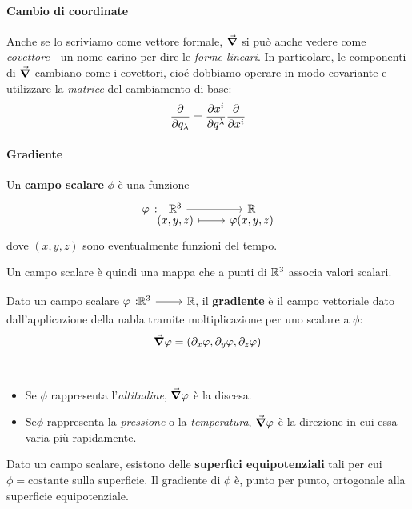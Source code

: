 \paragraph{Cambio di coordinate} %
Anche se lo scriviamo come vettore formale, $\grad$ si può anche vedere come \textit{covettore} - un nome carino per dire le \textit{forme lineari}. In particolare, le componenti di $\grad$ cambiano come i covettori, cioé dobbiamo operare in modo covariante e utilizzare la \textit{matrice} del cambiamento di base:
\begin{equation}
	\pdv{q_\lambda}=\pdv{x^i}{q^\lambda}\pdv{x^i}
\end{equation}
\paragraph{Gradiente}
\begin{define}
	Un \textbf{campo scalare} $\phi$ è una funzione
	\begin{equation}
		\funztot[\phi]{\realset^3}{\realset}{(x,y,z)}{\phi(x,y,z)}
	\end{equation}
	dove $(x,y,z)$ sono eventualmente funzioni del tempo.
\end{define}
Un campo scalare è quindi una mappa che a punti di $\mathbb{R}^3$ associa valori scalari.
\begin{define}[Gradiente]\label{gradiente}
	Dato un campo scalare $\funz[\phi]{\realset^3}{\realset}$, il \textbf{gradiente} è il campo vettoriale dato dall'applicazione della nabla tramite moltiplicazione per uno scalare a $\phi$:
	\begin{equation}
		\grad{\varphi}=\left(\partial_x\varphi,\partial_y\varphi,\partial_z\varphi\right)
	\end{equation}
\end{define}
\begin{examples}~
	\begin{itemize}
		\item Se $\phi$ rappresenta l'\textit{altitudine}, $\grad{\varphi}$ è la discesa.
		\item Se$\phi$ rappresenta la \textit{pressione} o la \textit{temperatura}, $\grad{\varphi}$ è la direzione in cui essa varia più rapidamente.
	\end{itemize}
\end{examples}
\begin{observe}
	Dato un campo scalare, esistono delle \textbf{superfici equipotenziali} tali per cui $\phi=\text{costante}$ sulla superficie. Il gradiente di $\phi$ è, punto per punto, ortogonale alla superficie equipotenziale.
\end{observe}
